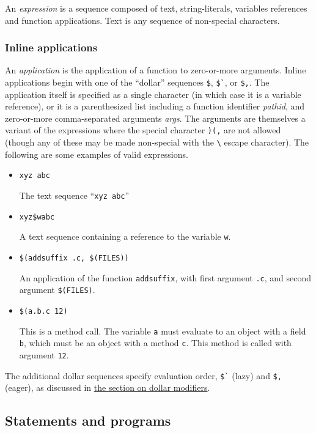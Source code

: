 An \emph{expression} is a sequence composed of text, string-literals, variables references and
function applications.  Text is any sequence of non-special characters.

\subsubsection{Inline applications}

An \emph{application} is the application of a function to zero-or-more arguments.  Inline
applications begin with one of the ``dollar'' sequences \verb+$+, \verb+$`+, or \verb+$,+.  The
application itself is specified as a single character (in which case it is a variable reference), or
it is a parenthesized list including a function identifier \emph{pathid}, and zero-or-more
comma-separated arguments \emph{args}.  The arguments are themselves a variant of the expressions
where the special character \verb+)(,+ are not allowed (though any of these may be made non-special
with the \verb+\+ escape character).  The following are some examples of valid expressions.

\begin{itemize}
\item \verb+xyz abc+

The text sequence ``\verb+xyz abc+''

\item \verb+xyz$wabc+

A text sequence containing a reference to the variable \verb+w+.

\item \verb+$(addsuffix .c, $(FILES))+

An application of the function \verb+addsuffix+, with first argument \verb+.c+, and second argument \verb+$(FILES)+.

\item \verb+$(a.b.c 12)+

This is a method call.  The variable \verb+a+ must evaluate to an object with a field \verb+b+,
which must be an object with a method \verb+c+.  This method is called with argument \verb+12+.
\end{itemize}

The additional dollar sequences specify evaluation order, \verb+$`+ (lazy) and \verb+$,+ (eager), as
discussed in \href{#dollar}{the section on dollar modifiers}.

\subsection{Statements and programs}

